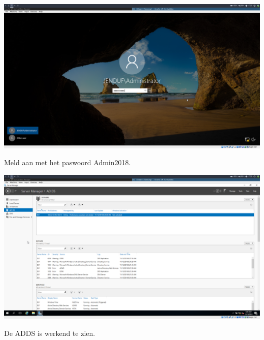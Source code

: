 \documentclass[a4paper]{article}
\begin{document}
\begin{center}
	\includegraphics[width=15cm]{Pictures/DC1/ADDS/1542299418.png}
	
	Meld aan met het paswoord Admin2018.
\end{center}
\begin{center}
	\includegraphics[width=15cm]{Pictures/DC1/ADDS/1542299460.png}
	
	De ADDS is werkend te zien.
\end{center}
\end{document}
